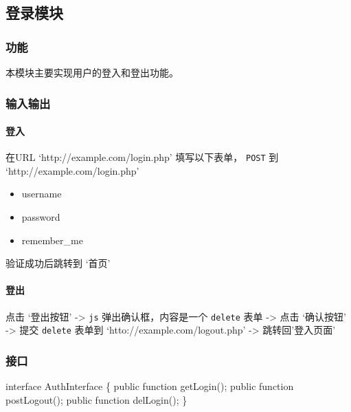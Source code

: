 \documentclass[a4paper,fancyhdr,fntef,hyperref]{ctexart}
\newenvironment{Shaded}{}{}
\newcommand{\NormalTok}[1]{{#1}}
\begin{document}
\subsection{登录模块}\label{ux767bux5f55ux6a21ux5757-1}

\subsubsection{功能}\label{ux529fux80fd}

本模块主要实现用户的登入和登出功能。

\subsubsection{输入输出}\label{ux8f93ux5165ux8f93ux51fa}

\paragraph{登入}\label{ux767bux5165}

在URL `http://example.com/login.php' 填写以下表单， \texttt{POST} 到
`http://example.com/login.php'

\begin{itemize}
\itemsep1pt\parskip0pt
\item
  username
\item
  password
\item
  remember\_me
\end{itemize}

验证成功后跳转到 `首页'

\paragraph{登出}\label{ux767bux51fa}

点击 `登出按钮' -\textgreater{} \texttt{js} 弹出确认框，内容是一个
\texttt{delete} 表单 -\textgreater{} 点击 `确认按钮' -\textgreater{}
提交 \texttt{delete} 表单到 `htto://example.com/logout.php'
-\textgreater{} 跳转回'登入页面'

\subsubsection{接口}\label{ux63a5ux53e3}

\begin{Shaded}
\begin{Highlighting}[]
\NormalTok{interface AuthInterface \{}
    \NormalTok{public function getLogin();}
    \NormalTok{public function postLogout();}
    \NormalTok{public function delLogin();}
\NormalTok{\}}
\end{Highlighting}
\end{Shaded}
\end{document}
